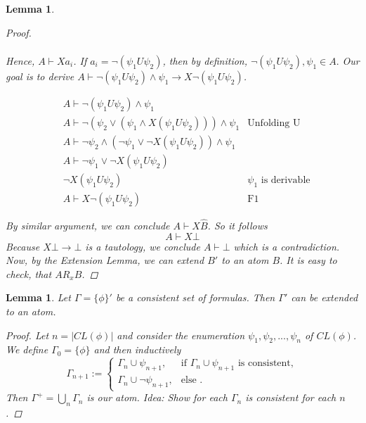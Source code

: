 \documentclass[11pt]{article}
\newtheorem{lemma}[theorem]{Lemma}
\theoremstyle{definition}
\theoremstyle{remark}
\begin{document}
\begin{lemma}
\begin{proof}
\[\begin{array}{rll}
        \end{array}
        \]

        Hence, $A \vdash Xa_i$. If $a_i = \neg (\psi_1 U \psi_2)$, then by
        definition, $\neg(\psi_1 U \psi_2), \psi_1 \in A.$ Our goal is to derive
        $A \vdash \neg(\psi_1 U \psi_2) \land \psi_1 \rightarrow X \neg (\psi_1 U \psi_2)$.

        \[
        \begin{array}{rll} 
                & A \vdash \neg(\psi_1 U \psi_2) \land \psi_1 \\
                & A \vdash \neg(\psi_2 \lor (\psi_1 \land X(\psi_1 U \psi_2))) \land \psi_1
                & \text{Unfolding U} \\
                & A \vdash \neg \psi_2 \land (\neg \psi_1 \lor \neg X(\psi_1 U \psi_2)) \land \psi_1 \\
                & A \vdash \neg \psi_1 \lor \neg X(\psi_1 U \psi_2) \\
                & \neg X (\psi_1 U \psi_2) 
                & \text{$\psi_1$ is derivable} \\
                & A \vdash X \neg (\psi_1 U \psi_2) 
                & \text{F1}

        \end{array}
        \]

        
        By similar argument, we can conclude $A \vdash X\hat{B}$. So it follows 
        \[
            A \vdash X\bot
        \] 
        Because $X \bot \rightarrow \bot$ is a tautology, we conclude $A \vdash \bot$ which is a contradiction. 
        Now, by the Extension Lemma, we can extend $B'$ to an atom $B$. It is easy to check, that $A R_x B$.
        

\end{proof}

\end{lemma}

\begin{lemma}
    Let $\Gamma = \{\phi\}'$ be a consistent set of formulas. Then $\Gamma'$ can be extended to an atom.

    \begin{proof}
        Let $n = |CL(\phi)|$ and consider the enumeration $\psi_1, \psi_2,..., \psi_n$ of $CL(\phi)$.
        We define $\Gamma_0 = \{\phi\} $ and then inductively \[
\Gamma_{n+1} :=
\begin{cases}
    \Gamma_{n} \cup \psi_{n+1},  & \text{if } \Gamma_{n} \cup \psi_{n+1} \text{ is consistent}, \\
    \Gamma_{n} \cup \neg \psi_{n+1}, & \text{else }.
\end{cases}
\]
Then $\Gamma^+ = \bigcup_{n}^{} \Gamma_n$ is our atom. Idea: Show for each $\Gamma_n$ is consistent for each $n$.


    \end{proof}
\end{lemma}
\end{document}
